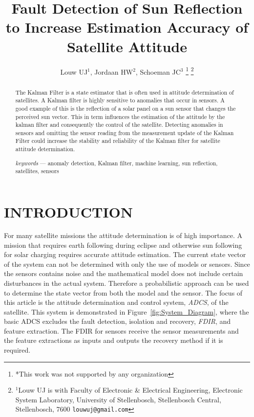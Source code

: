 \documentclass[letterpaper, 10 pt, conference]{ieeeconf}  %
\title{\LARGE \bf
Fault Detection of Sun Reflection to Increase Estimation Accuracy of Satellite Attitude
}
\author{Louw UJ$^{1}$, Jordaan HW$^{2}$, Schoeman JC$^{3}$%
\thanks{*This work was not supported by any organization}%
\thanks{$^{1}$Louw UJ is with Faculty of Electronic \& Electrical Engineering, Electronic System            Laboratory, University of Stellenbosch, Stellenbosch Central, Stellenbosch, 7600
        {\tt\small louwuj@gmail.com}}%
}
\begin{document}
\maketitle
\thispagestyle{empty}
\pagestyle{empty}


\begin{abstract}

The Kalman Filter is a state estimator that is often used in attitude determination of satellites. A Kalman filter is highly sensitive to anomalies that occur in sensors. A good example of this is the reflection of a solar panel on a sun sensor that changes the perceived sun vector. This in term influences the estimation of the attitude by the kalman filter and consequently the control of the satellite. Detecting anomalies in sensors and omitting the sensor reading from the measurement update of the Kalman Filter could increase the stability and reliability of the Kalman filter for satellite attitude determination.

\emph{keywords} --- anomaly detection, Kalman filter, machine learning, sun reflection, satellites, sensors

\end{abstract}


\section{INTRODUCTION}
For many satellite missions the attitude determination is of high importance. A mission that requires earth following during eclipse and otherwise sun following for solar charging requires accurate attitude estimation. The current state vector of the system can not be determined with only the use of models or sensors. Since the sensors contains noise and the mathematical model does not include certain disturbances in the actual system. Therefore a probabilistic approach can be used to determine the state vector from both the model and the sensor. The focus of this article is the attitude determination and control system, \emph{ADCS}, of the satellite. This system is demonstrated in Figure~\ref{fig:System_Diagram}, where the basic ADCS excludes the fault detection, isolation and recovery, \emph{FDIR}, and feature extraction. The FDIR for sensors receive the sensor measurements and the feature extractions as inputs and outputs the recovery method if it is required. 
\end{document}

